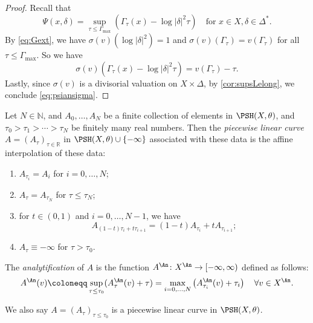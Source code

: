 \begin{proof}
Recall that
\[
\Psi(x,\delta)=\sup_{\tau\leq \Gamma_{\max}} (\Gamma_{\tau}(x)-\log|\delta|^2\tau)\quad \text{for }x\in X, \delta\in \Delta^*.
\]
By \eqref{eq:Gext}, we have $\sigma(v)(\log |\delta|^2)=1$ and $\sigma(v)(\Gamma_{\tau})=v(\Gamma_{\tau})$ for all $\tau\leq \Gamma_{\max}$. So we have
\[
\sigma(v)(\Gamma_\tau(x) - \log|\delta|^2 \tau) = v(\Gamma_\tau) - \tau.
\]
Lastly, since $\sigma(v)$ is a divisorial valuation on $X \times \Delta$, by \cref{cor:supsLelong}, we conclude \eqref{eq:psiansigma}.
\end{proof}

\begin{definition}\label{def:piecewiselincurv}
Let $N\in \mathbb{N}$, and $A_{0},\ldots,A_N$ be a finite collection of elements in $\PSH(X,\theta)$, and $\tau_0>\tau_1>\cdots>\tau_N$ be finitely many real numbers. Then the \emph{piecewise linear curve} $A=(A_{\tau})_{\tau\in \mathbb{R}}$ in $\PSH(X,\theta)\cup \{-\infty\}$ associated with these data is the affine interpolation of these data:
\begin{enumerate}
    \item\label{itm:def:piecewiselincurv:1} $A_{\tau_i}=A_i$ for $i=0,\ldots,N$;
    \item\label{itm:def:piecewiselincurv:2} $A_{\tau}=A_{\tau_N}$ for $\tau\leq \tau_N$;
    \item\label{itm:def:piecewiselincurv:3} for $t\in (0,1)$ and $i=0,\ldots,N-1$, we have
    \[
        A_{(1-t)\tau_i+t\tau_{i+1}}=(1-t)A_{\tau_i}+tA_{\tau_{i+1}};
    \]
    \item\label{itm:def:piecewiselincurv:4} $A_{\tau}\equiv -\infty$ for $\tau>\tau_0$.
\end{enumerate}
The \emph{analytification} of $A$ is the function $A^{\An}\colon X^{\An}\rightarrow [-\infty,\infty)$ defined as follows:
\begin{equation}\label{eq:psianvlinear}
A^{\An}(v)\coloneqq \sup_{\tau\leq \tau_0} (A_\tau^{\An}(v)+\tau)=\max_{i=0,\ldots,N} \left(A_{\tau_i}^{\An}(v)+\tau_i\right)\quad \forall v\in X^{\An}.
\end{equation}
\end{definition}
We also say $A=(A_{\tau})_{\tau\leq \tau_0}$ is a piecewise linear curve in $\PSH(X,\theta)$.

